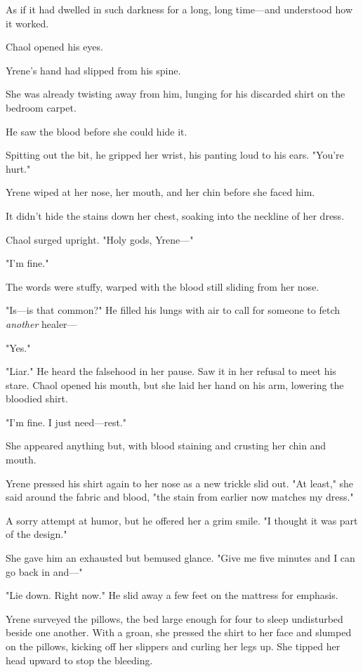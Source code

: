 As if it had dwelled in such darkness for a long, long time---and understood how it worked.

Chaol opened his eyes.

Yrene's hand had slipped from his spine.

She was already twisting away from him, lunging for his discarded shirt on the bedroom carpet.

He saw the blood before she could hide it.

Spitting out the bit, he gripped her wrist, his panting loud to his ears.
"You're hurt."

Yrene wiped at her nose, her mouth, and her chin before she faced him.

It didn't hide the stains down her chest, soaking into the neckline of her dress.

Chaol surged upright.
"Holy gods, Yrene---"

"I'm fine."

The words were stuffy, warped with the blood still sliding from her nose.

"Is---is that common?"
He filled his lungs with air to call for someone to fetch \emph{another} healer---

"Yes."

"Liar."
He heard the falsehood in her pause.
Saw it in her refusal to meet his stare.
Chaol opened his mouth, but she laid her hand on his arm, lowering the bloodied shirt.

"I'm fine.
I just need---rest."

She appeared anything but, with blood staining and crusting her chin and mouth.

Yrene pressed his shirt again to her nose as a new trickle slid out.
"At least," she said around the fabric and blood, "the stain from earlier now matches my dress."

A sorry attempt at humor, but he offered her a grim smile.
"I thought it was part of the design."

She gave him an exhausted but bemused glance.
"Give me five minutes and I can go back in and---"

"Lie down.
Right now."
He slid away a few feet on the mattress for emphasis.

Yrene surveyed the pillows, the bed large enough for four to sleep undisturbed beside one another.
With a groan, she pressed the shirt to her face and slumped on the pillows, kicking off her slippers and curling her legs up.
She tipped her head upward to stop the bleeding.

